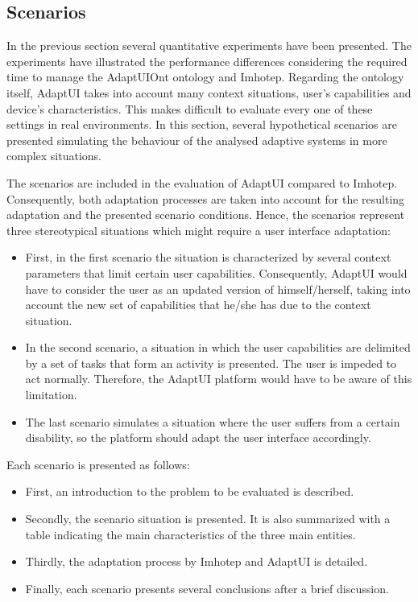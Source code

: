 \subsection{Scenarios}
\label{sec:scenarios}

In the previous section several quantitative experiments have been presented.
The experiments have illustrated the performance differences considering the 
required time to manage the AdaptUIOnt ontology and Imhotep. Regarding the 
ontology itself, AdaptUI takes into account many context situations, user's 
capabilities and device's characteristics. This makes difficult to evaluate 
every one of these settings in real environments. In this section, several 
hypothetical scenarios are presented simulating the behaviour of the analysed 
adaptive systems in more complex situations.

The scenarios are included in the evaluation of AdaptUI compared to Imhotep.
Consequently, both adaptation processes are taken into account for the 
resulting adaptation and the presented scenario conditions. Hence, the scenarios
represent three stereotypical situations which might require a user interface 
adaptation:

\begin{itemize}
  \item First, in the first scenario the situation is characterized by several
  context parameters that limit certain user capabilities. Consequently, 
  AdaptUI would have to consider the user as an updated version of 
  himself/herself, taking into account the new set of capabilities that 
  he/she has due to the context situation.
  
  \item In the second scenario, a situation in which the user capabilities are 
  delimited by a set of tasks that form an activity is presented. The user is 
  impeded to act normally. Therefore, the AdaptUI platform would have to be 
  aware of this limitation. 
  
  \item The last scenario simulates a situation where the user suffers from a 
  certain disability, so the platform should adapt the user interface 
  accordingly.
\end{itemize}

Each scenario is presented as follows:

\begin{itemize}
  \item First, an introduction to the problem to be evaluated is described.
  
  \item Secondly, the scenario situation is presented. It is also summarized with
  a table indicating the main characteristics of the three main entities.
  
  \item Thirdly, the adaptation process by Imhotep and AdaptUI is detailed.
  
  \item Finally, each scenario presents several conclusions after a brief 
  discussion.
\end{itemize}

